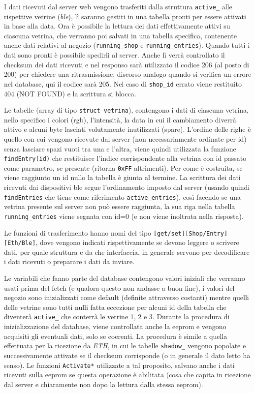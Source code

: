 I dati ricevuti dal server web vengono trasferiti dalla struttura \texttt{active\_} alle rispettive vetrine (\textit{ble}), l\`i saranno gestiti in una tabella pronti per essere attivati in base alla data. Ora \`e possibile la lettura dei dati effettivamente attivi su ciascuna vetrina, che verranno poi salvati in una tabella specifica, contenente anche dati relativi al negozio (\texttt{running\_shop} e \texttt{running\_entries}). Quando tutti i dati sono pronti \`e possibile spedirli al server. Anche l\`i verr\`a controllato il checksum dei dati ricevuti e nel responso sar\`a utilizzato il codice 206 (al posto di 200) per chiedere una ritrasmissione, discorso analogo quando si verifica un errore nel database, qui il codice sar\`a 205. Nel caso di \texttt{shop\_id} errato viene restituito 404 (NOT FOUND) e la scrittura si blocca.

Le tabelle (array di tipo \texttt{struct vetrina}), contengono i dati di ciascuna vetrina, nello specifico i colori (rgb), l'intensit\`a, la data in cui il cambiamento diverr\`a attivo e alcuni byte lasciati volutamente inutilizzati (spare). L'ordine delle righe \`e quello con cui vengono ricevute dal server (non necessariamente ordinate per id) senza lasciare spazi vuoti tra una e l'altra, viene quindi utilizzata la funzione \texttt{findEntry(id)} che restituisce l'indice corrispondente alla vetrina con id passato come parametro, se presente (ritorna \texttt{0xFF} altrimenti). Per come \`e costruita, se viene raggiunto un id nullo la tabella \`e giunta al termine. La scrittura dei dati ricevuti dai dispositivi ble segue l'ordinamento imposto dal server (usando quindi \texttt{findEntries} che tiene come riferimento \texttt{active\_entries}), cos\`i facendo se una vetrina presente sul server non pu\`o essere raggiunta, la sua riga nella tabella \texttt{running\_entries} viene segnata con id=0 (e non viene inoltrata nella risposta).

Le funzioni di trasferimento hanno nomi del tipo \texttt{[get/set][Shop/Entry][Eth/Ble]}, dove vengono indicati rispettivamente se devono leggere o scrivere dati, per quale struttura e da che interfaccia, in generale servono per decodificare i dati ricevuti o preparare i dati da inviare.

Le variabili che fanno parte del database contengono valori iniziali che verranno usati prima del fetch (e qualora questo non andasse a buon fine), i valori del negozio sono inizializzati come default (definite attraverso costanti) mentre quelli delle vetrine sono tutti nulli fatta eccezione per alcuni id della tabella che diventer\`a \texttt{active\_} che conterr\`a le vetrine 1, 2 e 3. Durante la procedura di inizializzazione del database, viene controllata anche la eeprom e vengono acquisiti gli eventuali dati, solo se coerenti. La procedura \`e simile a quella effettuata per la ricezione da \textit{ETH}, in cui le tabelle \texttt{shadow\_} vengono popolate e successivamente attivate se il checksum corrisponde (o in generale il dato letto ha senso). Le funzioni \texttt{Activate*} utilizzate a tal proposito, salvano anche i dati ricevuti sulla eeprom se questa operazione \`e abilitata (cosa che capita in ricezione dal server e chiaramente non dopo la lettura dalla stessa eeprom).

